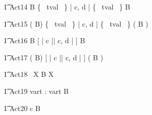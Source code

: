 
\begin{circusaction}
        \t1 Act14 \circdef  {} \rcirctime \circstartby B  \lpar \{~ tval ~\} | \lchanset c, d \rchanset | \{~ tval ~\} \rpar {} \rcirctime \circstartby B\\
\end{circusaction}

\begin{circusaction}
        \t1 Act15 \circdef (  \rcirctime \circstartby B)  \lpar \{~ tval ~\} | \lchanset c, d \rchanset | \{~ tval ~\} \rpar (  \rcirctime \circstartby B )\\
\end{circusaction}


\begin{circusaction}
        \t1 Act16 \circdef  {} \rcirctime \circstartby B  [ | \lchanset c \rchanset || \lchanset c, d \rchanset | ]  \rcirctime \circstartby B\\
\end{circusaction}

\begin{circusaction}
        \t1 Act17 \circdef (  \rcirctime \circstartby B)  [ | \lchanset c \rchanset || \lchanset c, d \rchanset | ] (  \rcirctime \circstartby B )\\
\end{circusaction}


\begin{circusaction}
	\t1 Act18 \circdef \circmu~X \circspot  {} \rcirctime \circstartby B \circseq X \\
\end{circusaction}


\begin{circusaction}
	\t1 Act19 \circdef \circvres vart : \nat  \circspot  \lcirctime vart \rcirctime \circstartby B \\
\end{circusaction}


\begin{circusaction}
	\t1 Act20 \circdef c \then   {} \rcirctime \circstartby B \\
\end{circusaction}

